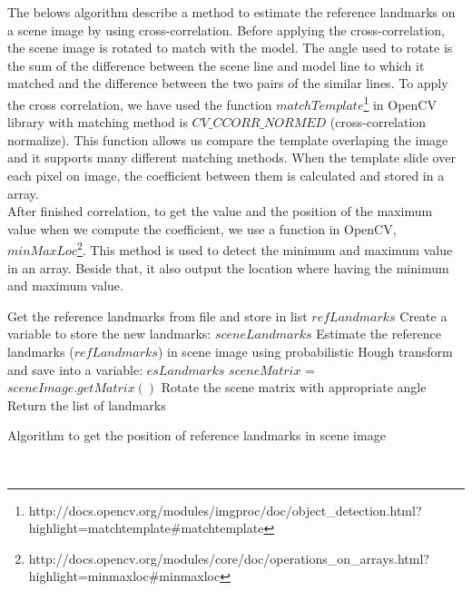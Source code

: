 The belows algorithm describe a method to estimate the reference landmarks on a scene image by using cross-correlation. Before applying the cross-correlation, the scene image is rotated to match with the model. The angle used to rotate is the sum of the difference between the scene line and model line to which it matched and the difference between the two pairs of the similar lines. To apply the cross correlation, we have used the function $matchTemplate$\footnote{http://docs.opencv.org/modules/imgproc/doc/object\_detection.html?highlight=matchtemplate\#matchtemplate} in OpenCV library with matching method is $CV\_CCORR\_NORMED$ (cross-correlation normalize). This function allows us compare the template overlaping the image and it supports many different matching methods. When the template slide over each pixel on image, the coefficient between them is calculated and stored in a array.\\[0.2cm]
After finished correlation, to get the value and the position of the maximum value when we compute the coefficient, we use a function in OpenCV,  $minMaxLoc$\footnote{http://docs.opencv.org/modules/core/doc/operations\_on\_arrays.html?highlight=minmaxloc\#minmaxloc}. This method is used to detect the minimum and maximum value in an array. Beside that, it also output the location where having the minimum and maximum value.\\[0.2cm]
\begin{algorithm}[H]
\Indm 
{}
\Indp
Get the reference landmarks from file and store in list $refLandmarks$\;
Create a variable to store the new landmarks: $sceneLandmarks$\;
Estimate the reference landmarks ($refLandmarks$) in scene image using probabilistic Hough transform and save into a variable: $esLandmarks$\;
$sceneMatrix$ = $sceneImage.getMatrix()$\;
Rotate the scene matrix with appropriate angle\;
Return the list of landmarks\;
\caption{Algorithm to get the position of reference landmarks in scene image}
\label{alccross}
\end{algorithm}~\\[0.2cm]
